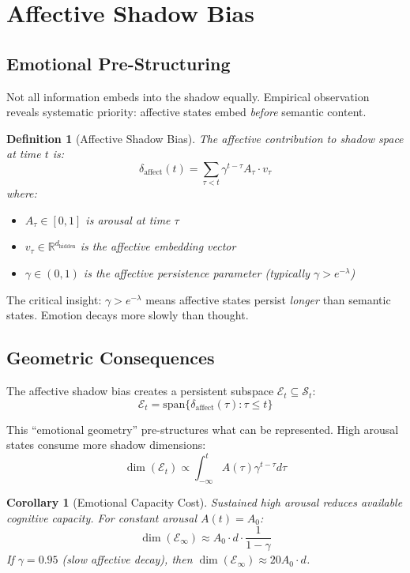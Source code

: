 \documentclass[reprint, amsmath, amssymb, aps, prd]{revtex4-2}
\newtheorem{definition}{Definition}[section]
\newtheorem{corollary}{Corollary}[section]
\begin{document}
\section{Affective Shadow Bias}

\subsection{Emotional Pre-Structuring}

Not all information embeds into the shadow equally. Empirical observation reveals systematic priority: affective states embed \textit{before} semantic content.

\begin{definition}[Affective Shadow Bias]
The affective contribution to shadow space at time $t$ is:
\[
\delta_{\text{affect}}(t) = \sum_{\tau < t} \gamma^{t-\tau} A_\tau \cdot v_\tau
\]
where:
\begin{itemize}
    \item $A_\tau \in [0,1]$ is arousal at time $\tau$
    \item $v_\tau \in \mathbb{R}^{d_{\text{hidden}}}$ is the affective embedding vector
    \item $\gamma \in (0,1)$ is the affective persistence parameter (typically $\gamma > e^{-\lambda}$)
\end{itemize}
\end{definition}

The critical insight: $\gamma > e^{-\lambda}$ means affective states persist \textit{longer} than semantic states. Emotion decays more slowly than thought.

\subsection{Geometric Consequences}

The affective shadow bias creates a persistent subspace $\mathcal{E}_t \subseteq \mathcal{S}_t$:
\[
\mathcal{E}_t = \text{span}\{\delta_{\text{affect}}(\tau) : \tau \leq t\}
\]

This ``emotional geometry'' pre-structures what can be represented. High arousal states consume more shadow dimensions:
\[
\dim(\mathcal{E}_t) \propto \int_{-\infty}^t A(\tau) \gamma^{t-\tau} d\tau
\]

\begin{corollary}[Emotional Capacity Cost]
Sustained high arousal reduces available cognitive capacity. For constant arousal $A(t) = A_0$:
\[
\dim(\mathcal{E}_\infty) \approx A_0 \cdot d \cdot \frac{1}{1-\gamma}
\]
If $\gamma = 0.95$ (slow affective decay), then $\dim(\mathcal{E}_\infty) \approx 20 A_0 \cdot d$.
\end{corollary}
\end{document}
